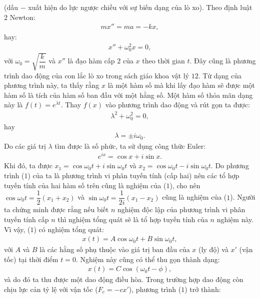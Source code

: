 \begin{multicols}{2}
	(dấu $-$ xuất hiện do lực ngược chiều với sự biến dạng của lò xo).
	\vskip 0.1cm
	Theo định luật $2$ Newton:
	\begin{align*}
		mx''=ma=-kx,
	\end{align*}
	hay:
	\begin{align*}
		x''+\omega_0^2 x=0,		\tag{$1$}
	\end{align*}
	với $\omega_0 = \sqrt{\dfrac{k}{m}}$ và $x''$ là đạo hàm cấp $2$ của $x$ theo thời gian $t$.
	\vskip 0.1cm 
	Đây cũng là phương trình dao động của con lắc lò xo trong sách giáo khoa vật lý $12$.
	\vskip 0.1cm
	Từ dạng của phương trình này, ta thấy rằng $x$ là một hàm số mà khi lấy đạo hàm sẽ được một hàm số là tích của hàm số ban đầu với một hằng số. Một hàm số thỏa mãn dạng này là $f(t) = e^{\lambda t}$. Thay $f(x)$ vào phương trình dao động và rút gọn ta được:
	\begin{align*}
		\lambda^2 + \omega_0^2 = 0,
	\end{align*}
	hay 
	\begin{align*}
		\lambda = \pm i \omega_0.
	\end{align*}
	Do các giá trị $\lambda$ tìm được là số phức, ta sử dụng công thức Euler:
	\begin{align*}
		e^{ix} = \cos x + i \sin x.
	\end{align*}
	Khi đó, ta được $x_1 = \cos\omega_0t + i\sin\omega_0t$ và $x_2 = \cos \omega_0t - i\sin \omega_0t$.
	\vskip 0.1cm
	Do phương trình ($1$) của ta là phương trình vi phân tuyến tính (cấp hai) nên các tổ hợp tuyến tính của hai hàm số trên cũng là nghiệm của ($1$), cho nên $\cos\omega_0t = \dfrac{1}{2}(x_1 + x_2)$ và $\sin \omega_0t = \dfrac{1}{2i}(x_1-x_2)$ cũng là nghiệm của ($1$).
	\vskip 0.1cm
	Người ta chứng minh được rằng nếu biết $n$ nghiệm độc lập của phương trình vi phân tuyến tính cấp $n$ thì nghiệm tổng quát sẽ là tổ hợp tuyến tính của $n$ nghiệm này. Vì vậy, ($1$) có nghiệm tổng quát:
	\begin{align*}
		x(t) = A \cos \omega_0t + B \sin \omega_0t,
	\end{align*}
	với $A$ và $B$ là các hằng số phụ thuộc vào giá trị ban đầu của $x$ (ly độ) và $x'$ (vận tốc) tại thời điểm $t=0$. Nghiệm này cũng có thể thu gọn thành dạng:
	\begin{align*}
		x(t) = C \cos(\omega_0t - \phi),
	\end{align*}
	và do đó ta thu được một dao động điều hòa.
	\vskip 0.1cm
	Trong trường hợp dao động còn chịu lực cản tỷ lệ với vận tốc ($F_c=-cx'$), phương trình ($1$) trở thành:
	\begin{align*}

\end{align*}
\end{multicols}
